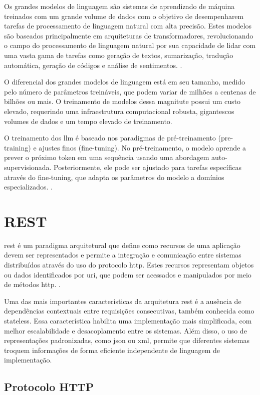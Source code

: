 Os grandes modelos de linguagem são sistemas de aprendizado de máquina treinados com um grande volume de dados com o objetivo de desempenharem tarefas de processamento de linguagem natural com alta precisão. Estes modelos são baseados principalmente em arquiteturas de transformadores, revolucionando o campo do processamento de linguagem natural por sua capacidade de lidar com uma vasta gama de tarefas como geração de textos, sumarização, tradução automática, geração de códigos e análise de sentimentos. \cite{IBMLLM}.

O diferencial dos grandes modelos de linguagem está em seu tamanho, medido pelo número de parâmetros treináveis, que podem variar de milhões a centenas de bilhões ou mais. O treinamento de modelos dessa magnitute possui um custo elevado, requerindo uma infraestrutura computacional robusta, gigantescos volumes de dados e um tempo elevado de treinamento. 

O treinamento dos \gls{llm} é baseado nos paradigmas de pré-treinamento (pre-training) e ajustes finos (fine-tuning). No pré-treinamento, o modelo aprende a prever o próximo token em uma sequência usando uma abordagem auto-supervisionada. Posteriormente, ele pode ser ajustado para tarefas específicas através do fine-tuning, que adapta os parâmetros do modelo a domínios especializados. \cite{Zhou2023}.

\section{REST}\label{sec:rest}

\gls{rest} é um paradigma arquitetural que define como recursos de uma aplicação devem ser representados e permite a integração e comunicação entre sistemas distribuídos através do uso do protocolo \gls{http}. Estes recursos representam objetos ou dados identificados por \gls{uri}, que podem ser acessados e manipulados por meio de métodos \gls{http}. \cite{Fielding2000}.

Uma das mais importantes caracteristicas da arquitetura \gls{rest} é a ausência de dependências contextuais entre requisições consecutivas, também conhecida como stateless. Essa característica habilita uma implementação mais simplificada, com melhor escalabilidade e desacoplamento entre os sistemas. Além disso, o uso de representações padronizadas, como \gls{json} ou \gls{xml}, permite que diferentes sistemas troquem informações de forma eficiente independente de linguagem de implementação.

\subsection{Protocolo HTTP}\label{subsec:http}

